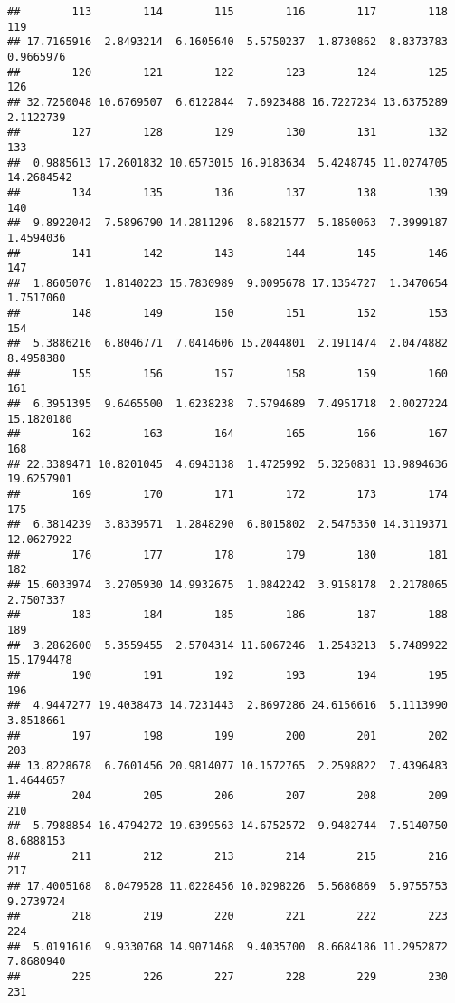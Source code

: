 \documentclass[
]{article}
\begin{document}
\begin{verbatim}
##        113        114        115        116        117        118        119 
## 17.7165916  2.8493214  6.1605640  5.5750237  1.8730862  8.8373783  0.9665976 
##        120        121        122        123        124        125        126 
## 32.7250048 10.6769507  6.6122844  7.6923488 16.7227234 13.6375289  2.1122739 
##        127        128        129        130        131        132        133 
##  0.9885613 17.2601832 10.6573015 16.9183634  5.4248745 11.0274705 14.2684542 
##        134        135        136        137        138        139        140 
##  9.8922042  7.5896790 14.2811296  8.6821577  5.1850063  7.3999187  1.4594036 
##        141        142        143        144        145        146        147 
##  1.8605076  1.8140223 15.7830989  9.0095678 17.1354727  1.3470654  1.7517060 
##        148        149        150        151        152        153        154 
##  5.3886216  6.8046771  7.0414606 15.2044801  2.1911474  2.0474882  8.4958380 
##        155        156        157        158        159        160        161 
##  6.3951395  9.6465500  1.6238238  7.5794689  7.4951718  2.0027224 15.1820180 
##        162        163        164        165        166        167        168 
## 22.3389471 10.8201045  4.6943138  1.4725992  5.3250831 13.9894636 19.6257901 
##        169        170        171        172        173        174        175 
##  6.3814239  3.8339571  1.2848290  6.8015802  2.5475350 14.3119371 12.0627922 
##        176        177        178        179        180        181        182 
## 15.6033974  3.2705930 14.9932675  1.0842242  3.9158178  2.2178065  2.7507337 
##        183        184        185        186        187        188        189 
##  3.2862600  5.3559455  2.5704314 11.6067246  1.2543213  5.7489922 15.1794478 
##        190        191        192        193        194        195        196 
##  4.9447277 19.4038473 14.7231443  2.8697286 24.6156616  5.1113990  3.8518661 
##        197        198        199        200        201        202        203 
## 13.8228678  6.7601456 20.9814077 10.1572765  2.2598822  7.4396483  1.4644657 
##        204        205        206        207        208        209        210 
##  5.7988854 16.4794272 19.6399563 14.6752572  9.9482744  7.5140750  8.6888153 
##        211        212        213        214        215        216        217 
## 17.4005168  8.0479528 11.0228456 10.0298226  5.5686869  5.9755753  9.2739724 
##        218        219        220        221        222        223        224 
##  5.0191616  9.9330768 14.9071468  9.4035700  8.6684186 11.2952872  7.8680940 
##        225        226        227        228        229        230        231 

\end{verbatim}
\end{document}

